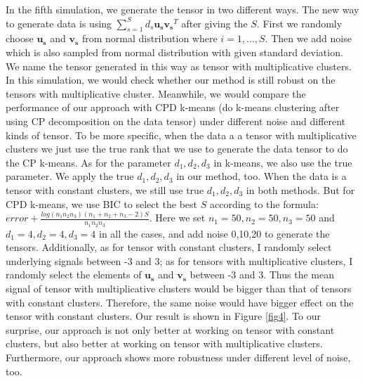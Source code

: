 \documentclass{article}
\begin{document}
In the fifth simulation, we generate the tensor in two different ways. The new way to generate data is using $\sum_{s=1}^{S}d_s\mathbf{u_s}\mathbf{v_s}^T$ after giving the $S$.  First we randomly choose $\mathbf{u_s}$ and $\mathbf{v_s}$ from normal distribution where $i=1,...,S$. Then we add noise which is also sampled from normal distribution with given standard deviation. We name the tensor generated in this way as tensor with multiplicative clusters. In this simulation, we would check whether our method is still robust on the tensors with multiplicative cluster. Meanwhile, we would compare the performance of our approach with CPD k-means (do k-means clustering after using CP decomposition on the data tensor) under different noise and different kinds of tensor. To be more specific, when the data a a tensor with multiplicative clusters we just use the true rank that we use to generate the data tensor to do the CP k-means. As for the parameter $d_1, d_2, d_3$ in k-means, we also use the true parameter. We apply the true $d_1, d_2, d_3$ in our method, too. When the data is a tensor with constant clusters, we still use true $d_1, d_2, d_3$ in both methods. But for CPD k-means, we use BIC to select the best $S$ according to the formula: $error+\frac{log(n_1n_2n_3)(n_1+n_2+n_3-2)S}{n_1n_2n_3}$.  Here we set  $n_1=50,n_2=50,n_3=50$ and $d_1=4,d_2=4,d_3=4$ in all the cases, and add noise 0,10,20 to generate the tensors. Additionally, as for tensor with constant clusters, I randomly select underlying signals between -3 and 3; as for tensors with multiplicative clusters, I randomly select the elements of $\mathbf{u_s}$ and $\mathbf{v_s}$ between -3 and 3. Thus the mean signal of tensor with multiplicative clusters would be bigger than that of tensors with constant clusters. Therefore, the same noise would have bigger effect on the tensor with constant clusters. Our result is shown in Figure \ref{fig4}. To our surprise, our approach is not only better at working on tensor with constant clusters, but also better at working on tensor with multiplicative clusters. Furthermore, our approach shows more robustness under different level of noise, too. \par 
\end{document}
